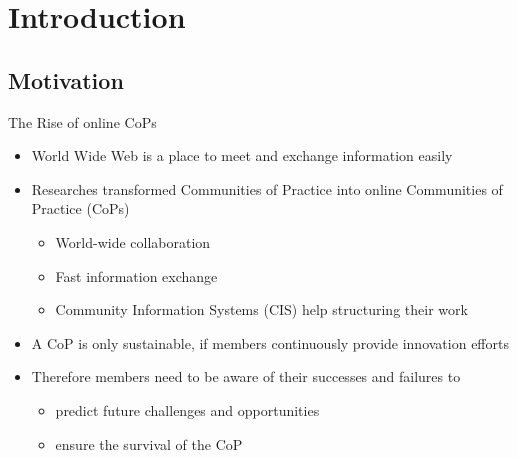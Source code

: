 \section{Introduction}

\subsection{Motivation}


\begin{frame}{The Rise of online CoPs}
  \begin{itemize}
    \item World Wide Web is a place to meet and exchange information easily
    \item Researches transformed Communities of Practice into online Communities of Practice (CoPs)
          \begin{itemize}
            \item World-wide collaboration
            \item Fast information exchange
            \item Community Information Systems (CIS) help structuring their work
          \end{itemize}
    \item A CoP is only sustainable, if members continuously provide innovation efforts \cite{RKJa15}
    \item Therefore members need to be aware of their successes and failures to 
    \begin{itemize}
        \item predict future challenges and opportunities
        \item ensure the survival of the CoP
    \end{itemize}
  \end{itemize}

\end{frame}

